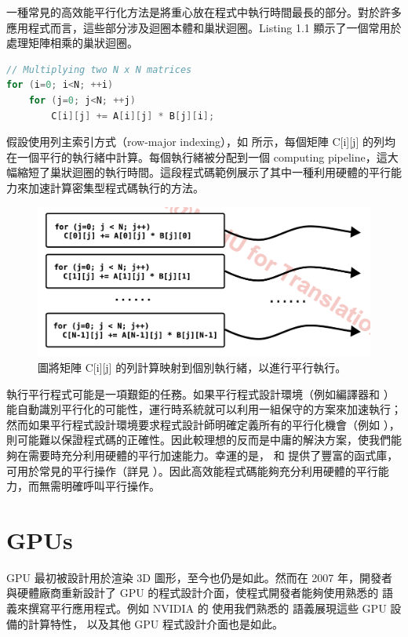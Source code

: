 一種常見的高效能平行化方法是將重心放在程式中執行時間最長的部分。對於許多應用程式而言，這些部分涉及迴圈本體和巢狀迴圈。Listing 1.1 顯示了一個常用於處理矩陣相乘的巢狀迴圈。


\begin{lstlisting}[language=C, caption={簡單的巢狀迴圈範例——矩陣相乘。}, captionpos=t, label={lst:nestloop}]
// Multiplying two N x N matrices
for (i=0; i<N; ++i)
    for (j=0; j<N; ++j)
        C[i][j] += A[i][j] * B[j][i];
\end{lstlisting}



假設使用列主索引方式（row-major indexing），如 所示，每個矩陣 C[i][j] 的列均在一個平行的執行緒中計算。每個執行緒被分配到一個 computing pipeline，這大幅縮短了巢狀迴圈的執行時間。這段程式碼範例展示了其中一種利用硬體的平行能力來加速計算密集型程式碼執行的方法。

\begin{figure}[h]
    \centering
    \includegraphics[width=0.8\linewidth]{FileAusiliari/Screenshots/Figure1-1.png}
    \caption{圖將矩陣 C[i][j] 的列計算映射到個別執行緒，以進行平行執行。}
    \label{fig:lds}
\end{figure}

執行平行程式可能是一項艱鉅的任務。如果平行程式設計環境（例如編譯器和 ）能自動識別平行化的可能性，運行時系統就可以利用一組保守的方案來加速執行；然而如果平行程式設計環境要求程式設計師明確定義所有的平行化機會（例如 ），則可能難以保證程式碼的正確性。因此較理想的反而是中庸的解決方案，使我們能夠在需要時充分利用硬體的平行加速能力。幸運的是， 和  提供了豐富的函式庫，可用於常見的平行操作（詳見 ）。因此高效能程式碼能夠充分利用硬體的平行能力，而無需明確呼叫平行操作。

\section{GPUs}
GPU 最初被設計用於渲染 3D 圖形，至今也仍是如此。然而在 2007 年，開發者與硬體廠商重新設計了 GPU 的程式設計介面，使程式開發者能夠使用熟悉的  語義來撰寫平行應用程式。例如 NVIDIA 的  使用我們熟悉的  語義展現這些 GPU 設備的計算特性， 以及其他 GPU 程式設計介面也是如此。

